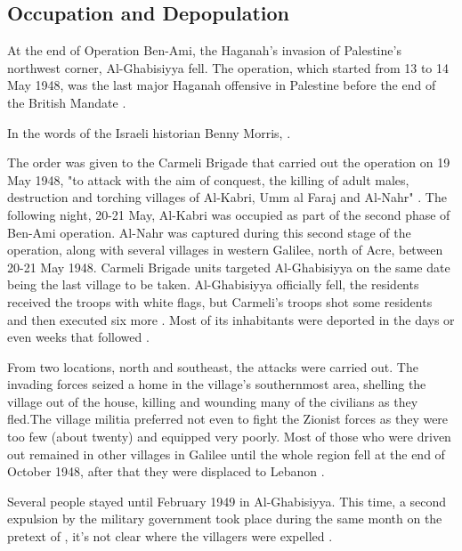 \subsection{Occupation and Depopulation}

At the end of Operation Ben-Ami, the Haganah's invasion of Palestine's northwest corner, Al-Ghabisiyya fell. The operation, which started from 13 to 14 May 1948, was the last major Haganah offensive in Palestine before the end of the British Mandate \citep{Khalidi2015}.

In the words of the Israeli historian Benny Morris,  \cite[p.252]{Morris2004}.

The order was given to the Carmeli Brigade that carried out the operation on 19 May 1948, "to attack with the aim of conquest, the killing of adult males, destruction and torching villages of Al-Kabri, Umm al Faraj and Al-Nahr" \cite[p.253]{Morris2004}. The following night, 20-21 May, Al-Kabri was occupied as part of the second phase of Ben-Ami operation. Al-Nahr was captured during this second stage of the operation, along with several villages in western Galilee, north of Acre, between 20-21 May 1948. Carmeli Brigade units targeted Al-Ghabisiyya on the same date being the last village to be taken. Al-Ghabisiyya officially fell, the residents received the troops with white flags, but Carmeli's troops shot some residents and then executed six more \citep{Morris2008}. Most of its inhabitants were deported in the days or even weeks that followed \citep{Morris2004}.

From two locations, north and southeast, the attacks were carried out. The invading forces seized a home in the village's southernmost area, shelling the village out of the house, killing and wounding many of the civilians as they fled.The village militia preferred not even to fight the Zionist forces as they were too few (about twenty) and equipped very poorly. Most of those who were driven out remained in other villages in Galilee until the whole region fell at the end of October 1948, after that they were displaced to Lebanon \citep{Khalidi2015}.

Several people stayed until February 1949 in Al-Ghabisiyya. This time, a second expulsion by the military government took place during the same month on the pretext of , it's not clear where the villagers were expelled \citep{Morris2004}.

